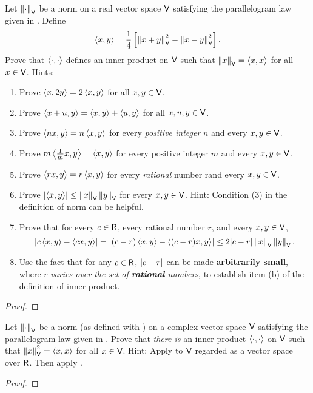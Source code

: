 \begin{exercise} \label{exercise 6.1.29}
Let \(\left\lVert \cdot \right\rVert_{\textsf{V}}\) be a norm on a real vector space \(\textsf{V}\) satisfying the parallelogram law given in .
Define
\[
    \left< x, y \right> = \frac{1}{4} \left[ \left\lVert x + y\right\rVert_{\textsf{V}}^2 - \left\lVert x - y\right\rVert_{\textsf{V}}^2 \right].
\]
Prove that \(\left< \cdot, \cdot \right>\) defines an inner product on \(\textsf{V}\) such that \(\left\lVert x\right\rVert_{\textsf{V}} = \left< x, x \right>\) for all \(x \in \textsf{V}\).
Hints:
\begin{enumerate}
\item Prove \(\left< x, 2y \right> = 2 \left< x, y \right>\) for all \(x, y \in \textsf{V}\).
\item Prove \(\left< x + u, y \right> = \left< x, y \right> + \left< u, y \right>\) for all \(x, u, y \in \textsf{V}\).
\item Prove \(\left< nx, y \right> = n \left< x, y \right>\) for every \emph{positive integer} \(n\) and every \(x, y \in \textsf{V}\).
\item Prove \(m \left< \frac{1}{m} x, y \right> = \left< x, y \right>\) for every positive integer \(m\) and every \(x, y \in \textsf{V}\).
\item Prove \(\left< rx, y \right> = r \left< x, y \right>\) for every \emph{rational} number rand every \(x, y \in \textsf{V}\).
\item Prove \(\lvert \left< x, y \right> \rvert \le \left\lVert x\right\rVert_{\textsf{V}} \left\lVert y\right\rVert_{\textsf{V}}\) for every \(x, y \in \textsf{V}\).
Hint: Condition (3) in the definition of norm can be helpful.
\item Prove that for every \(c \in \textsf{R}\), every rational number \(r\), and every \(x, y \in \textsf{V}\),
\[
    \lvert c \left< x, y \right> - \left< cx, y \right> \rvert = \lvert (c - r) \left< x, y \right> - \left<(c - r)x, y \right>\rvert \le 2\lvert c - r\rvert \left\lVert x\right\rVert_{\textsf{V}} \left\lVert y\right\rVert_{\textsf{V}}.
\]
\item Use the fact that for any \(c \in \textsf{R}\), \(\lvert c - r\rvert\) can be made \textbf{arbitrarily small}, where \(r\) \emph{varies over the set of \textbf{rational} numbers}, to establish item (b) of the definition of inner product.
\end{enumerate}
\end{exercise}

\begin{proof}
\end{proof}

\begin{exercise} \label{exercise 6.1.30}
Let \(\left\lVert\cdot\right\rVert_{\textsf{V}}\) be a norm (as defined with ) on a complex vector space \(\textsf{V}\) satisfying the parallelogram law given in .
Prove that \emph{there is} an inner product \(\left< \cdot, \cdot \right>\) on \(\textsf{V}\) such that \(\left\lVert x\right\rVert_{\textsf{V}}^2 = \left< x, x \right>\) for all \(x \in \textsf{V}\).
Hint: Apply  to \(\textsf{V}\) regarded as a vector space over \(\textsf{R}\).
Then apply .
\end{exercise}
\begin{proof}
\end{proof}
